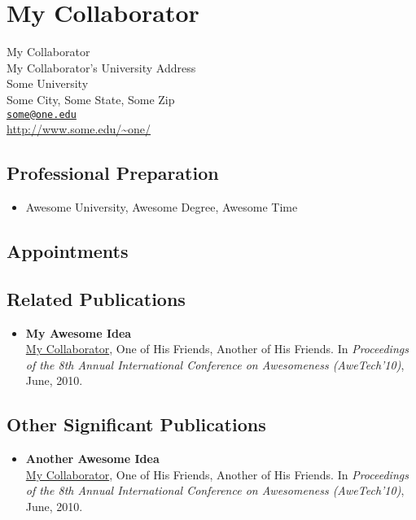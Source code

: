 \chapter{My Collaborator}

My Collaborator\\
My Collaborator's University Address\\
Some University\\
Some City, Some State, Some Zip\\
\href{mailto:some@one.edu}{\texttt{some@one.edu}}\\
\url{http://www.some.edu/~one/}

\section{Professional Preparation}

\begin{itemize}
\item Awesome University, Awesome Degree, Awesome Time
\end{itemize}

\section{Appointments}

\section{Related Publications}

\begin{itemize}

\item \textbf{My Awesome Idea}\\ \uline{My Collaborator}, One of His Friends,
Another of His Friends. In \emph{Proceedings of the 8th Annual International
Conference on Awesomeness (AweTech’10)}, June, 2010.

\end{itemize}

\section{Other Significant Publications}

\begin{itemize}

\item \textbf{Another Awesome Idea}\\ \uline{My Collaborator}, One of His
Friends, Another of His Friends. In \emph{Proceedings of the 8th Annual
International Conference on Awesomeness (AweTech’10)}, June, 2010.

\end{itemize}

